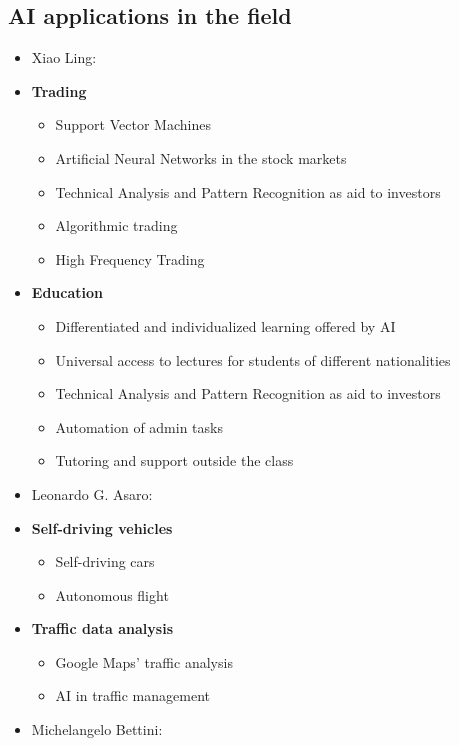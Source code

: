 \documentclass[12pt]{article}
\begin{document}
 \subsection{AI applications in the field}
 \begin{itemize}[label=$\bullet$]
     \item[\ding{212}] Xiao Ling:
     \item \textbf{Trading}
     \begin{itemize}[label=$\circ$]
         \item Support Vector Machines
         \item Artificial Neural Networks in the stock markets
         \item Technical Analysis and Pattern Recognition as aid to investors
         \item Algorithmic trading
         \item High Frequency Trading
     \end{itemize}
     \item \textbf{Education}
     \begin{itemize}[label=$\circ$]
         \item Differentiated and individualized learning offered by AI
         \item Universal access to lectures for students of different nationalities
         \item Technical Analysis and Pattern Recognition as aid to investors
         \item Automation of admin tasks
         \item Tutoring and support outside the class
     \end{itemize}
     \item[\ding{212}] Leonardo G. Asaro:
     \item \textbf{Self-driving vehicles}
     \begin{itemize}[label=$\circ$]
         \item Self-driving cars
         \item Autonomous flight
     \end{itemize}
     \item \textbf{Traffic data analysis}
     \begin{itemize}[label=$\circ$]
         \item Google Maps' traffic analysis
         \item AI in traffic management
     \end{itemize}
     \item[\ding{212}] Michelangelo Bettini:

\end{itemize}
\end{document}
